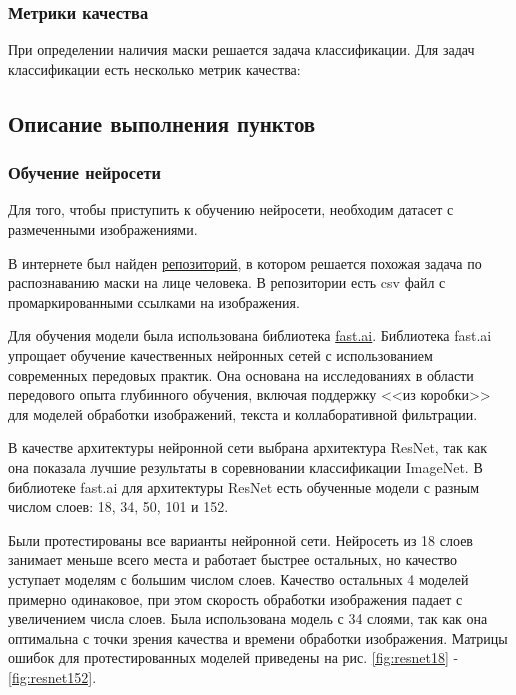 \documentclass[a4paper,14pt]{article}
\begin{document}
\subsubsection{Метрики качества}
При определении наличия маски решается задача классификации.
Для задач классификации есть несколько метрик качества:



\subsection{Описание выполнения пунктов}

\subsubsection{Обучение нейросети}

Для того, чтобы приступить к обучению нейросети, необходим датасет с размеченными изображениями.

В интернете был найден \href{https://github.com/UniversalDataTool/coronavirus-mask-image-dataset}{репозиторий}, в котором решается похожая задача по распознаванию маски на лице человека.
В репозитории есть csv файл с промаркированными ссылками на изображения.

Для обучения модели была использована библиотека \href{https://docs.fast.ai/}{fast.ai}.
Библиотека fast.ai упрощает обучение качественных нейронных сетей с использованием современных передовых практик.
Она основана на исследованиях в области передового опыта глубинного обучения, включая поддержку <<из коробки>> для моделей обработки изображений, текста и коллаборативной фильтрации.

В качестве архитектуры нейронной сети выбрана архитектура ResNet, так как она показала лучшие результаты в соревновании классификации ImageNet.
В библиотеке fast.ai для архитектуры ResNet есть обученные модели с разным числом слоев: 18, 34, 50, 101 и 152.

Были протестированы все варианты нейронной сети.
Нейросеть из 18 слоев занимает меньше всего места и работает быстрее остальных, но качество уступает моделям с большим числом слоев.
Качество остальных 4 моделей примерно одинаковое, при этом скорость обработки изображения падает с увеличением числа слоев.
Была использована модель с 34 слоями, так как она оптимальна с точки зрения качества и времени обработки изображения.
Матрицы ошибок для протестированных моделей приведены на рис. \ref{fig:resnet18} - \ref{fig:resnet152}.
\end{document}
